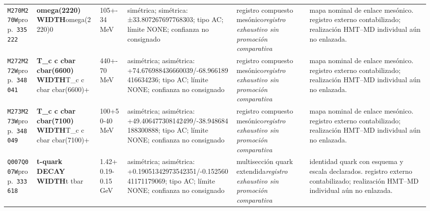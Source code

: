\begin{landscape}
\begin{longtable}{L{1.85cm}L{4.45cm}L{2.35cm}L{4.05cm}L{3.35cm}L{7.15cm}}
\texttt{M270}\newline \texttt{M270W}\newline prop.\ \texttt{335222} & \textbf{omega(2220) WIDTH}\newline omega(2220)0 & 105+-34\,MeV & simétrica; simétrica: ±33.807267697768303; tipo AC; límite NONE; confianza no consignado & registro compuesto mesónico\newline \emph{registro exhaustivo sin promoción comparativa} & mapa nominal de enlace mesónico. registro externo contabilizado; realización HMT--MD individual aún no enlazada. \\
\texttt{M272}\newline \texttt{M272W}\newline prop.\ \texttt{348041} & \textbf{T\_\allowbreak{}c c cbar cbar(6600) WIDTH}\newline T\_\allowbreak{}c c cbar cbar(6600)+ & 440+-70\,MeV & asimétrica; asimétrica: +74.676988436660039/-68.966189416634236; tipo AC; límite NONE; confianza no consignado & registro compuesto mesónico\newline \emph{registro exhaustivo sin promoción comparativa} & mapa nominal de enlace mesónico. registro externo contabilizado; realización HMT--MD individual aún no enlazada. \\
\texttt{M273}\newline \texttt{M273W}\newline prop.\ \texttt{348049} & \textbf{T\_\allowbreak{}c c cbar cbar(7100) WIDTH}\newline T\_\allowbreak{}c c cbar cbar(7100)+ & 100+50-40\,MeV & asimétrica; asimétrica: +49.406477308142499/-38.948684188300888; tipo AC; límite NONE; confianza no consignado & registro compuesto mesónico\newline \emph{registro exhaustivo sin promoción comparativa} & mapa nominal de enlace mesónico. registro externo contabilizado; realización HMT--MD individual aún no enlazada. \\
\texttt{Q007}\newline \texttt{Q007W}\newline prop.\ \texttt{333618} & \textbf{t-quark DECAY WIDTH}\newline t \textbar{}\allowbreak{} tbar & 1.42+0.19-0.15\,GeV & asimétrica; asimétrica: +0.19051342973542351/-0.15256041171179069; tipo AC; límite NONE; confianza no consignado & multisección quark extendida\newline \emph{registro exhaustivo sin promoción comparativa} & identidad quark con esquema y escala declarados. registro externo contabilizado; realización HMT--MD individual aún no enlazada. \\

\end{longtable}
\end{landscape}
